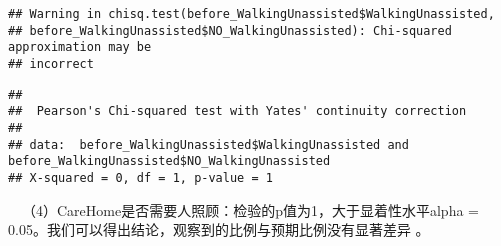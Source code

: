 \documentclass[
]{article}
\newenvironment{Shaded}{\begin{snugshade}}{\end{snugshade}}
\newcommand{\AttributeTok}[1]{\textcolor[rgb]{0.77,0.63,0.00}{#1}}
\newcommand{\FunctionTok}[1]{\textcolor[rgb]{0.00,0.00,0.00}{#1}}
\newcommand{\NormalTok}[1]{#1}
\newcommand{\OtherTok}[1]{\textcolor[rgb]{0.56,0.35,0.01}{#1}}
\newcommand{\SpecialCharTok}[1]{\textcolor[rgb]{0.00,0.00,0.00}{#1}}
\newcommand{\StringTok}[1]{\textcolor[rgb]{0.31,0.60,0.02}{#1}}
\begin{document}
\begin{Shaded}
\end{Shaded}

\begin{verbatim}
## Warning in chisq.test(before_WalkingUnassisted$WalkingUnassisted,
## before_WalkingUnassisted$NO_WalkingUnassisted): Chi-squared approximation may be
## incorrect
\end{verbatim}

\begin{verbatim}
## 
##  Pearson's Chi-squared test with Yates' continuity correction
## 
## data:  before_WalkingUnassisted$WalkingUnassisted and before_WalkingUnassisted$NO_WalkingUnassisted
## X-squared = 0, df = 1, p-value = 1
\end{verbatim}

 （4）CareHome是否需要人照顾：检验的p值为1，大于显着性水平alpha =
0.05。我们可以得出结论，观察到的比例与预期比例没有显著差异 。
\end{document}
